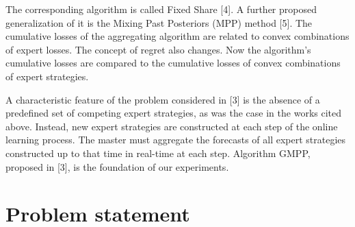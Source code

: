 \documentclass[12pt, twoside]{article}
\begin{document}
The corresponding algorithm is called Fixed Share [4]. A further proposed generalization of it is the Mixing Past Posteriors (MPP) method [5]. The cumulative losses of the aggregating algorithm are related to convex combinations of expert losses. The concept of regret also changes. Now the algorithm's cumulative losses are compared to the cumulative losses of convex combinations of expert strategies.

A characteristic feature of the problem considered in [3] is the absence of a predefined set of competing expert strategies, as was the case in the works cited above. Instead, new expert strategies are constructed at each step of the online learning process. The master must aggregate the forecasts of all expert strategies constructed up to that time in real-time at each step. Algorithm GMPP, proposed in [3], is the foundation of our experiments. 

\section{Problem statement}
%
%
%
%
%


\end{document}
